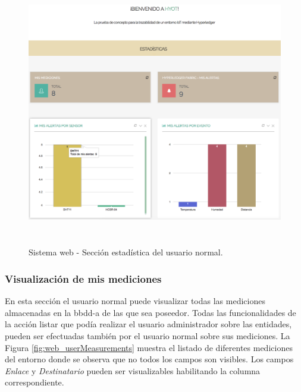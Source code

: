 \documentclass[12pt,a4paper, twoside]{report}
\begin{document}
	\begin{figure}[!ht]   
		\caption{Sistema web - Sección estadística del usuario normal.} 
		\begin{center} 
			\includegraphics[width=16cm, height=11cm]{Images/userGuide/web/normalUserEstadisticas} \\
			\label{fig:web_normalUserEstadisticas} 
		\end{center}  	
	\end{figure}

	\subsubsection{Visualización de mis mediciones}

	En esta sección el usuario normal puede visualizar todas las mediciones almacenadas en la \gls{bbdd-a} de las que sea poseedor. Todas las funcionalidades de la acción listar que podía realizar el usuario administrador sobre las entidades, pueden ser efectuadas también por el usuario normal sobre sus mediciones. La Figura \ref{fig:web_userMeasurements} muestra el listado de diferentes mediciones del entorno donde se observa que no todos los campos son visibles. Los campos \textit{Enlace} y \textit{Destinatario} pueden ser visualizables habilitando la columna correspondiente.
	
\end{document}
